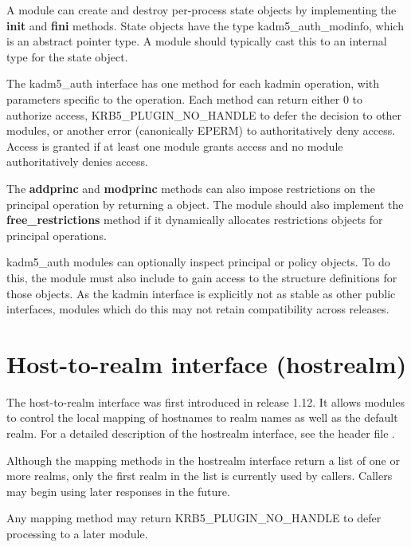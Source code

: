 \documentclass[letterpaper,10pt,english]{sphinxmanual}
\begin{document}
A module can create and destroy per-process state objects by
implementing the \textbf{init} and \textbf{fini} methods.  State objects have
the type kadm5\_auth\_modinfo, which is an abstract pointer type.  A
module should typically cast this to an internal type for the state
object.

The kadm5\_auth interface has one method for each kadmin operation,
with parameters specific to the operation.  Each method can return
either 0 to authorize access, KRB5\_PLUGIN\_NO\_HANDLE to defer the
decision to other modules, or another error (canonically EPERM) to
authoritatively deny access.  Access is granted if at least one module
grants access and no module authoritatively denies access.

The \textbf{addprinc} and \textbf{modprinc} methods can also impose restrictions
on the principal operation by returning a  object.  The module should also implement
the \textbf{free\_restrictions} method if it dynamically allocates
restrictions objects for principal operations.

kadm5\_auth modules can optionally inspect principal or policy objects.
To do this, the module must also include  to gain
access to the structure definitions for those objects.  As the kadmin
interface is explicitly not as stable as other public interfaces,
modules which do this may not retain compatibility across releases.


\section{Host-to-realm interface (hostrealm)}
\label{plugindev/hostrealm:hostrealm-plugin}\label{plugindev/hostrealm::doc}\label{plugindev/hostrealm:host-to-realm-interface-hostrealm}
The host-to-realm interface was first introduced in release 1.12.  It
allows modules to control the local mapping of hostnames to realm
names as well as the default realm.  For a detailed description of the
hostrealm interface, see the header file
.

Although the mapping methods in the hostrealm interface return a list
of one or more realms, only the first realm in the list is currently
used by callers.  Callers may begin using later responses in the
future.

Any mapping method may return KRB5\_PLUGIN\_NO\_HANDLE to defer
processing to a later module.
\end{document}
